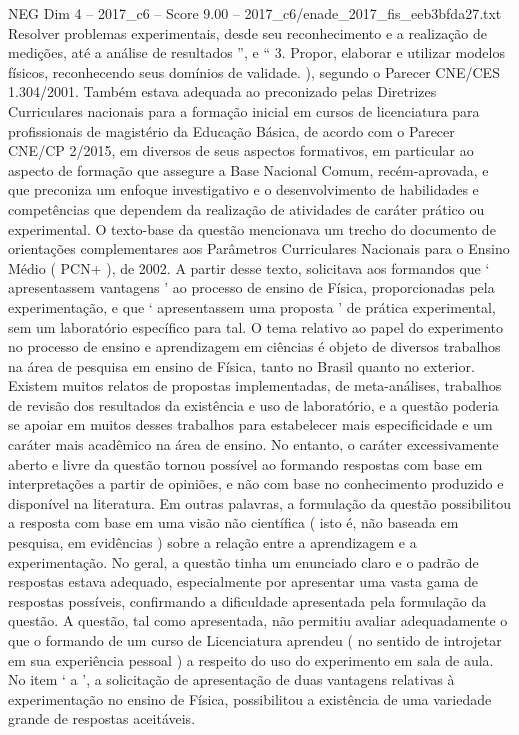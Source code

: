 \begin{textsample}{NEG Dim 4 – 2017\_c6 – Score 9.00 – 2017\_c6/enade\_2017\_fis\_eeb3bfda27.txt}
Resolver problemas experimentais, desde seu reconhecimento e a realização de medições, até a análise de resultados ”, e “ 3.
Propor, elaborar e utilizar modelos físicos, reconhecendo seus domínios de validade. ), segundo o Parecer CNE/CES 1.304/2001.
Também estava adequada ao preconizado pelas Diretrizes Curriculares nacionais para a formação inicial em cursos de licenciatura para profissionais de magistério da Educação Básica, de acordo com o Parecer CNE/CP 2/2015, em diversos de seus aspectos formativos, em particular ao aspecto de formação que assegure a Base Nacional Comum, recém-aprovada, e que preconiza um enfoque investigativo e o desenvolvimento de habilidades e competências que dependem da realização de atividades de caráter prático ou experimental.
O texto-base da questão mencionava um trecho do documento de orientações complementares aos Parâmetros Curriculares Nacionais para o Ensino Médio ( PCN+ ), de 2002.
A partir desse texto, solicitava aos formandos que ‘ apresentassem vantagens ’ ao processo de ensino de Física, proporcionadas pela experimentação, e que ‘ apresentassem uma proposta ’ de prática experimental, sem um laboratório específico para tal.
O tema relativo ao papel do experimento no processo de ensino e aprendizagem em ciências é objeto de diversos trabalhos na área de pesquisa em ensino de Física, tanto no Brasil quanto no exterior.
Existem muitos relatos de propostas implementadas, de meta-análises, trabalhos de revisão dos resultados da existência e uso de laboratório, e a questão poderia se apoiar em muitos desses trabalhos para estabelecer mais especificidade e um caráter mais acadêmico na área de ensino.
No entanto, o caráter excessivamente aberto e livre da questão tornou possível ao formando respostas com base em interpretações a partir de opiniões, e não com base no conhecimento produzido e disponível na literatura.
Em outras palavras, a formulação da questão possibilitou a resposta com base em uma visão não científica ( isto é, não baseada em pesquisa, em evidências ) sobre a relação entre a aprendizagem e a experimentação.
No geral, a questão tinha um enunciado claro e o padrão de respostas estava adequado, especialmente por apresentar uma vasta gama de respostas possíveis, confirmando a dificuldade apresentada pela formulação da questão.
A questão, tal como apresentada, não permitiu avaliar adequadamente o que o formando de um curso de Licenciatura aprendeu ( no sentido de introjetar em sua experiência pessoal ) a respeito do uso do experimento em sala de aula.
No item ‘ a ’, a solicitação de apresentação de duas vantagens relativas à experimentação no ensino de Física, possibilitou a existência de uma variedade grande de respostas aceitáveis.

\end{textsample}

